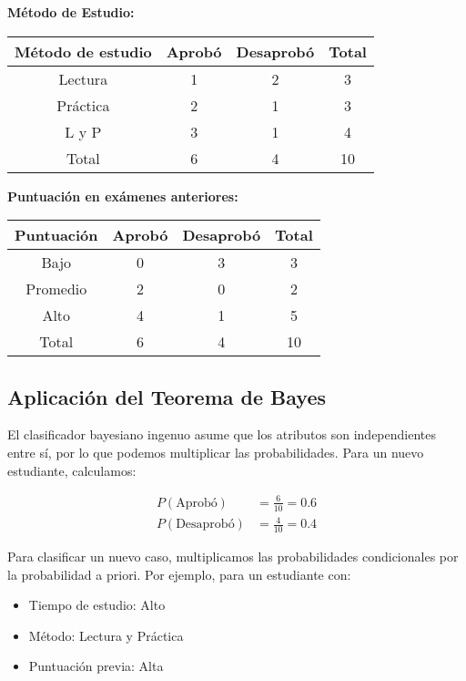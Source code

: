 \documentclass[12pt]{article}
\begin{document}
\textbf{Método de Estudio:}
\begin{table}[H]
    \centering
    \begin{tabular}{cccc}
        \toprule
        Método de estudio & Aprobó & Desaprobó & Total \\
        \midrule
        Lectura & 1 & 2 & 3 \\
        Práctica & 2 & 1 & 3 \\
        L y P & 3 & 1 & 4 \\
        \midrule
        Total & 6 & 4 & 10 \\
        \bottomrule
    \end{tabular}
\end{table}

\vspace{1em}

\textbf{Puntuación en exámenes anteriores:}
\begin{table}[H]
    \centering
    \begin{tabular}{cccc}
        \toprule
        Puntuación & Aprobó & Desaprobó & Total \\
        \midrule
        Bajo & 0 & 3 & 3 \\
        Promedio & 2 & 0 & 2 \\
        Alto & 4 & 1 & 5 \\
        \midrule
        Total & 6 & 4 & 10 \\
        \bottomrule
    \end{tabular}
\end{table}

\subsection{Aplicación del Teorema de Bayes}
El clasificador bayesiano ingenuo asume que los atributos son independientes entre sí, por lo que podemos multiplicar las probabilidades. Para un nuevo estudiante, calculamos:

\begin{align*}
P(\text{Aprobó}) &= \frac{6}{10} = 0.6 \\
P(\text{Desaprobó}) &= \frac{4}{10} = 0.4
\end{align*}

Para clasificar un nuevo caso, multiplicamos las probabilidades condicionales por la probabilidad a priori. Por ejemplo, para un estudiante con:
\begin{itemize}
    \item Tiempo de estudio: Alto
    \item Método: Lectura y Práctica
    \item Puntuación previa: Alta
\end{itemize}
\end{document}
